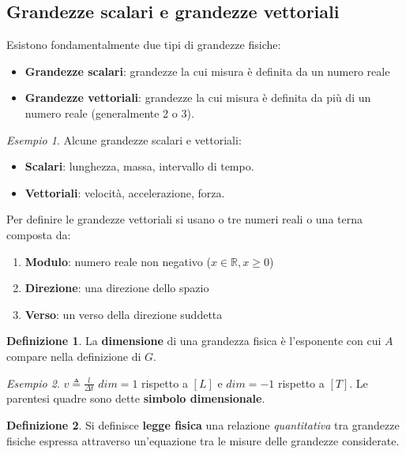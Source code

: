 \documentclass[a4paper, 12pt]{report}
\theoremstyle{definition}
\newtheorem{definition}{Definizione}[section]
\theoremstyle{remark}
\newtheorem*{example}{Esempio}
\theoremstyle{plain}
\newcommand{\R}{\mathbb{R}}
\begin{document}
\subsection{Grandezze scalari e grandezze vettoriali}

Esistono fondamentalmente due tipi di grandezze fisiche:
\begin{itemize}
    \item {\bf Grandezze scalari}: grandezze la cui misura è definita da un numero reale
    \item {\bf Grandezze vettoriali}: grandezze la cui misura è definita da più di un numero reale (generalmente 2 o 3).
\end{itemize}

\begin{example}
    Alcune grandezze scalari e vettoriali:
    \begin{itemize}
        \item {\bf Scalari}: lunghezza, massa, intervallo di tempo.
        \item {\bf Vettoriali}: velocità, accelerazione, forza.
    \end{itemize}
\end{example}

Per definire le grandezze vettoriali si usano o tre numeri reali o una terna composta da:
\begin{enumerate}
    \item {\bf Modulo}: numero reale non negativo ($x \in \R, x \geq 0$)
    \item {\bf Direzione}: una direzione dello spazio
    \item {\bf Verso}: un verso della direzione suddetta
\end{enumerate}

\begin{definition}
    La {\bf dimensione} di una grandezza fisica è l'esponente con cui $A$ compare nella definizione di $G$.
\end{definition}

\begin{example}
    $v \triangleq \frac{l}{\Delta t}$
    $dim = 1$ rispetto a $[L]$ e $dim = -1$ rispetto a $[T]$.
    Le parentesi quadre sono dette {\bf simbolo dimensionale}.
\end{example}

\begin{definition}
    Si definisce {\bf legge fisica} una relazione {\it quantitativa} tra grandezze fisiche espressa attraverso un'equazione tra le misure delle grandezze considerate. 
\end{definition}
\end{document}

